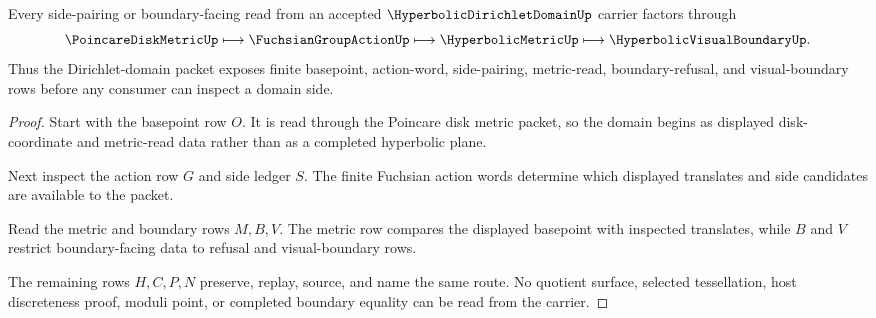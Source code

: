 \begin{theorem}
\label{thm:hyperbolic-dirichlet-domain-side-route}
Every side-pairing or boundary-facing read from an accepted $\HyperbolicDirichletDomainUp$ carrier factors through
$$
\PoincareDiskMetricUp \longmapsto \FuchsianGroupActionUp \longmapsto \HyperbolicMetricUp \longmapsto \HyperbolicVisualBoundaryUp .
$$
Thus the Dirichlet-domain packet exposes finite basepoint, action-word, side-pairing, metric-read, boundary-refusal, and visual-boundary rows before any consumer can inspect a domain side.
\end{theorem}
\begin{proof}
Start with the basepoint row $O$. It is read through the Poincare disk metric packet, so the domain begins as displayed disk-coordinate and metric-read data rather than as a completed hyperbolic plane.

Next inspect the action row $G$ and side ledger $S$. The finite Fuchsian action words determine which displayed translates and side candidates are available to the packet.

Read the metric and boundary rows $M,B,V$. The metric row compares the displayed basepoint with inspected translates, while $B$ and $V$ restrict boundary-facing data to refusal and visual-boundary rows.

The remaining rows $H,C,P,N$ preserve, replay, source, and name the same route. No quotient surface, selected tessellation, host discreteness proof, moduli point, or completed boundary equality can be read from the carrier.
\end{proof}




